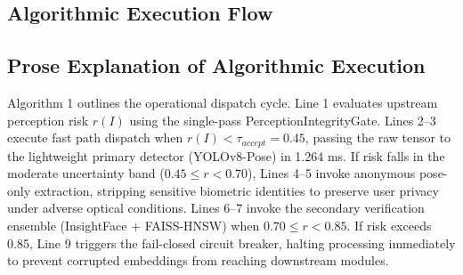 \documentclass[conference]{IEEEtran}
\begin{document}
\subsection{Algorithmic Execution Flow}
\begin{center}
\end{center}

\subsection{Prose Explanation of Algorithmic Execution}
Algorithm 1 outlines the operational dispatch cycle. Line 1 evaluates upstream perception risk $r(I)$ using the single-pass PerceptionIntegrityGate. Lines 2--3 execute fast path dispatch when $r(I) < \tau_{accept} = 0.45$, passing the raw tensor to the lightweight primary detector (YOLOv8-Pose) in 1.264 ms. If risk falls in the moderate uncertainty band ($0.45 \le r < 0.70$), Lines 4--5 invoke anonymous pose-only extraction, stripping sensitive biometric identities to preserve user privacy under adverse optical conditions. Lines 6--7 invoke the secondary verification ensemble (InsightFace + FAISS-HNSW) when $0.70 \le r < 0.85$. If risk exceeds 0.85, Line 9 triggers the fail-closed circuit breaker, halting processing immediately to prevent corrupted embeddings from reaching downstream modules.
\end{document}
